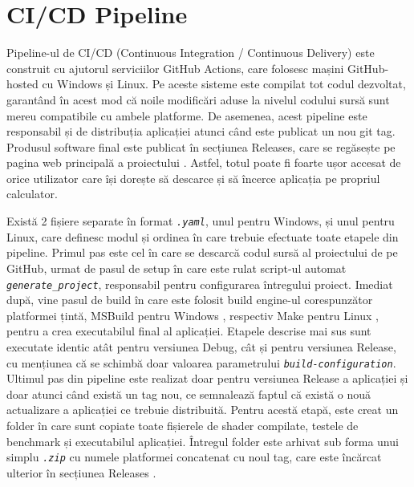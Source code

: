 \section{CI/CD Pipeline}
Pipeline-ul de CI/CD (Continuous Integration / Continuous Delivery) este construit cu ajutorul serviciilor GitHub Actions, care folosesc mașini GitHub-hosted cu Windows și Linux. Pe aceste sisteme este compilat tot codul dezvoltat, garantând în acest mod că noile modificări aduse la nivelul codului sursă sunt mereu compatibile cu ambele platforme. De asemenea, acest pipeline este responsabil și de distribuția aplicației atunci când este publicat un nou git tag. Produsul software final este publicat în secțiunea Releases, care se regăsește pe pagina web principală a proiectului \cite{ReleasesURL_citation}. Astfel, totul poate fi foarte ușor accesat de orice utilizator care își dorește să descarce și să încerce aplicația pe propriul calculator. 

Există 2 fișiere separate în format \textit{\texttt{.yaml}}, unul pentru Windows, și unul pentru Linux, care definesc modul și ordinea în care trebuie efectuate toate etapele din pipeline. Primul pas este cel în care se descarcă codul sursă al proiectului de pe GitHub, urmat de pasul de setup în care este rulat script-ul automat \textit{\texttt{generate\_project}}, responsabil pentru configurarea întregului proiect. Imediat după, vine pasul de build în care este folosit build engine-ul corespunzător platformei țintă, MSBuild pentru Windows \cite{MSBuild_citation}, respectiv Make pentru Linux \cite{Make_citation}, pentru a crea executabilul final al aplicației. Etapele descrise mai sus sunt executate identic atât pentru versiunea Debug, cât și pentru versiunea Release, cu mențiunea că se schimbă doar valoarea parametrului \textit{\texttt{build-configuration}}. Ultimul pas din pipeline este realizat doar pentru versiunea Release a aplicației și doar atunci când există un tag nou, ce semnalează faptul că există o nouă actualizare a aplicației ce trebuie distribuită. Pentru acestă etapă, este creat un folder în care sunt copiate toate fișierele de shader compilate, testele de benchmark și executabilul aplicației. Întregul folder este arhivat sub forma unui simplu \textit{\texttt{.zip}} cu numele platformei concatenat cu noul tag, care este încărcat ulterior în secțiunea Releases \cite{ReleasesURL_citation}.





